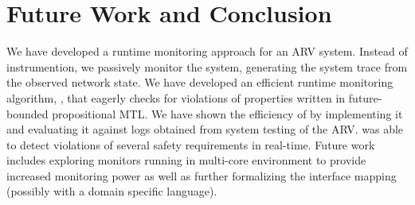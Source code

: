 
\section{Future Work and Conclusion}
We have developed a runtime monitoring approach for an ARV system.
Instead of instrumention, we passively monitor the system,
generating the system trace from the observed network state.
We have developed an efficient runtime monitoring algorithm, \monitor,
that eagerly checks for violations of properties written in future-bounded
propositional MTL. We have shown the efficiency of \monitor by implementing it
and evaluating it against logs obtained from system testing of the ARV.
\monitor was able to detect violations of several safety requirements in real-time.
Future work includes exploring monitors running in multi-core environment
to provide increased monitoring power as well as further
formalizing the interface mapping (possibly with a domain specific language).
